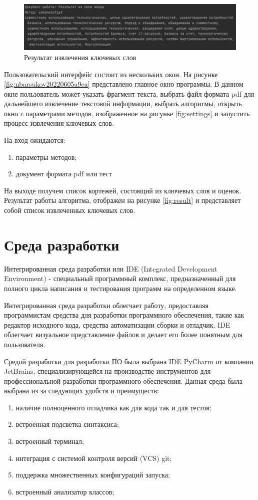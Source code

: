 \begin{figure}
	\centering
	\includegraphics[width=0.7\linewidth]{src/img/tech/nbarsukov_20220605_6adf}
	\caption{Результат извлечения ключевых слов}
	\label{fig:nbarsukov202206056adf}
\end{figure}

Пользовательский интерфейс состоит из нескольких окон.
На рисунке \ref{fig:nbarsukov20220605a9ea} представлено главное окно программы.
В данном окне пользователь может указать фрагмент текста, выбрать файл формата pdf для дальнейшего извлечение текстовой информации, выбрать алгоритмы, открыть окно c параметрами методов, изображенное на рисунке \ref{fig:settings} и запустить процесс извлечения ключевых слов.

На вход ожидаются:
\begin{enumerate}
	\item параметры методов;
	\item документ формата pdf или тест
\end{enumerate}
На выходе получем список кортежей, состоящий из ключевых слов и оценок.
Результат работы алгоритма, отображен на рисунке \ref{fig:result} и представляет собой список извлеченных ключевых слов.

\section{Среда разработки}
Интегрированная среда разработки или IDE (Integrated Development Environment) - специальный программный комплекс, предназначенный для полного цикла написания и тестирования программ на определенном языке.

Интегрированная среда разработки облегчает работу, предоставляя программистам средства для разработки программного обеспечения, такие как редактор исходного кода, средства автоматизации сборки и отладчик. 
IDE облегчает визуальное представление файлов и делает его более понятным для пользователя.

Средой разработки для разработки ПО была выбрана IDE PyCharm от компании JetBrains, специализирующейся на производстве инструментов для профессиональной разработки программного обеспечения.
Данная среда была выбрана из за следующих удобств и преимуществ:
\begin{enumerate}
	\item наличие полноценного отладчика как для кода так и для тестов;
	\item встроенная подсветка синтаксиса;
	\item встроенный терминал;
	\item интеграция с системой контроля версий (VCS) git;
	\item поддержка множественных конфигураций запуска;
	\item встроенный анализатор классов;
\end{enumerate}

